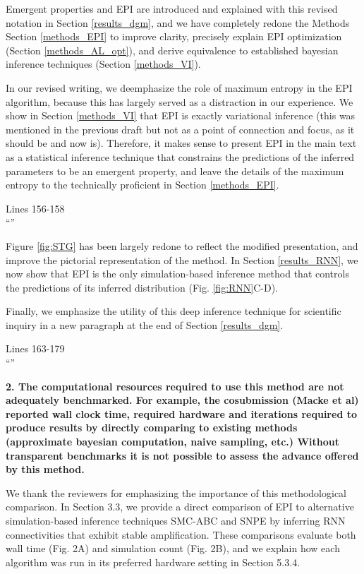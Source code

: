 \documentclass[11pt,a4paper]{article}
\begin{document}
Emergent properties and EPI are introduced and explained with this revised notation in Section \ref{results_dgm}, and we have completely redone the Methods Section \ref{methods_EPI} to improve clarity, precisely explain EPI optimization (Section \ref{methods_AL_opt}), and derive equivalence to established bayesian inference techniques (Section \ref{methods_VI}).

In our revised writing, we deemphasize the role of maximum entropy in the EPI algorithm, because this has largely served as a distraction in our experience.
We show in Section \ref{methods_VI} that EPI is exactly variational inference (this was mentioned in the previous draft but not as a point of connection and focus, as it should be and now is).   Therefore, it makes sense to present EPI in the main text as a statistical inference technique that constrains the predictions of the inferred parameters to be an emergent property, and leave the details of the maximum entropy to the technically proficient in Section \ref{methods_EPI}.

\begin{displayquote}
Lines 156-158\\
``''
\end{displayquote}

Figure \ref{fig:STG} has been largely redone to reflect the modified presentation, and improve the pictorial representation of the method.
In Section \ref{results_RNN}, we now show that EPI is the only simulation-based inference method that controls the predictions of its inferred distribution (Fig. \ref{fig:RNN}C-D).

Finally, we emphasize the utility of this deep inference technique for scientific inquiry in a new paragraph at the end of Section \ref{results_dgm}.

\begin{displayquote}
Lines 163-179\\
``''
\end{displayquote}

\textbf{2. The computational resources required to use this method are not adequately benchmarked. For example, the cosubmission (Macke et al) reported wall clock time, required hardware and iterations required to produce results by directly comparing to existing methods (approximate bayesian computation, naive sampling, etc.) Without transparent benchmarks it is not possible to assess the advance offered by this method.} 

We thank the reviewers for emphasizing the importance of this methodological comparison.  In Section 3.3, we provide a direct comparison of EPI to alternative simulation-based inference techniques SMC-ABC and SNPE by inferring RNN connectivities that exhibit stable amplification.  These comparisons evaluate both wall time (Fig. 2A) and simulation count (Fig. 2B), and we explain how each algorithm was run in its preferred hardware setting in Section 5.3.4.
 
\end{document}
